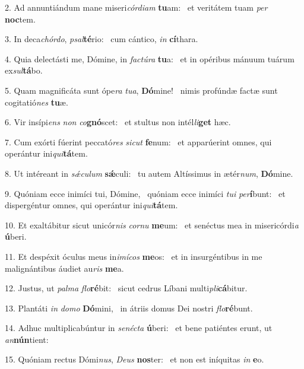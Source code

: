 2. Ad annuntiándum mane miseri\textit{cór}\textit{di}\textit{am} \textbf{tu}am: \ast\  et veritátem tuam \textit{per} \textbf{noc}tem.\

3. In deca\textit{chór}\textit{do}, \textit{psal}\textbf{té}rio: \ast\  cum cántico, \textit{in} \textbf{cí}thara.\

4. Quia delectásti me, Dómine, in \textit{fac}\textit{tú}\textit{ra} \textbf{tu}a: \ast\  et in opéribus mánuum tuárum ex\textit{sul}\textbf{tá}bo.\

5. Quam magnificáta sunt ópe\textit{ra} \textit{tu}\textit{a}, \textbf{Dó}mine! \ast\  nimis profúndæ factæ sunt cogitatió\textit{nes} \textbf{tu}æ.\

6. Vir insípi\textit{ens} \textit{non} \textit{co}\textbf{gnó}scet: \ast\  et stultus non intél\textit{li}\textbf{get} hæc.\

7. Cum exórti fúerint peccató\textit{res} \textit{sic}\textit{ut} \textbf{fe}num: \ast\  et apparúerint omnes, qui operántur ini\textit{qui}\textbf{tá}tem.\

8. Ut intéreant in \textit{sǽ}\textit{cu}\textit{lum} \textbf{sǽ}culi: \ast\  tu autem Altíssimus in ætér\textit{num}, \textbf{Dó}mine.\

9. Quóniam ecce inimíci tui, Dómine, \dag\  quóniam ecce inimíci \textit{tu}\textit{i} \textit{per}\textbf{í}bunt: \ast\  et dispergéntur omnes, qui operántur ini\textit{qui}\textbf{tá}tem.\

10. Et exaltábitur sicut unicór\textit{nis} \textit{cor}\textit{nu} \textbf{me}um: \ast\  et senéctus mea in misericórdi\textit{a} \textbf{ú}beri.\

11. Et despéxit óculus meus in\textit{i}\textit{mí}\textit{cos} \textbf{me}os: \ast\  et in insurgéntibus in me malignántibus áudiet au\textit{ris} \textbf{me}a.\

12. Justus, ut \textit{pal}\textit{ma} \textit{flo}\textbf{ré}bit: \ast\  sicut cedrus Líbani multi\textit{pli}\textbf{cá}bitur.\

13. Plantáti \textit{in} \textit{do}\textit{mo} \textbf{Dó}mini, \ast\  in átriis domus Dei nostri \textit{flo}\textbf{ré}bunt.\

14. Adhuc multiplicabúntur in \textit{se}\textit{néc}\textit{ta} \textbf{ú}beri: \ast\  et bene patiéntes erunt, ut \textit{an}\textbf{nún}tient:\

15. Quóniam rectus Dómi\textit{nus}, \textit{De}\textit{us} \textbf{nos}ter: \ast\  et non est iníquitas \textit{in} \textbf{e}o.\

